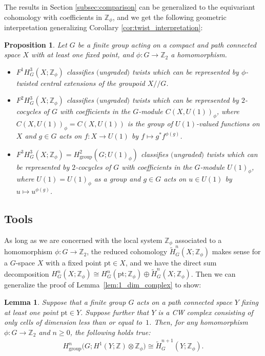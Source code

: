 \documentclass[pdftex]{sigma}
\newtheorem{prop}[thm]{Proposition}
\newtheorem{lem}[thm]{Lemma}
\theoremstyle{definition}
\newcommand{\Z}{\mathbb{Z}}
\newcommand{\pt}{\mathrm{pt}}
\begin{document}
The results in Section \ref{subsec:comparison} can be generalized to the equivariant cohomology with coef\/f\/icients in $\Z_\phi$, and we get the following geometric interpretation generalizing Corollary \ref{cor:twist_interpretation}:

\begin{prop} \label{prop:phi_twist_interpretation}
Let $G$ be a finite group acting on a compact and path connected space $X$ with at least one fixed point, and $\phi \colon G \to \Z_2$ a homomorphism.
\begin{itemize}\itemsep=0pt
\item[$(i)$]
$F^1H^3_G(X; \Z_\phi)$ classifies $($ungraded$)$ twists which can be represented by $\phi$-twisted central extensions of the groupoid $X/\!/G$.

\item[$(ii)$]
$F^2H^3_G(X; \Z_\phi)$ classifies $($ungraded$)$ twists which can be represented by $2$-cocycles of $G$ with coefficients in the $G$-module $C(X, U(1))_\phi$, where $C(X, U(1))_\phi = C(X, U(1))$ is the group of $U(1)$-valued functions on $X$ and $g \in G$ acts on $f \colon X \to U(1)$ by $f \mapsto g^*f^{\phi(g)}$.

\item[$(iii)$]
$F^3H^3_G(X; \Z_\phi) = H^2_{\mathrm{group}}(G; U(1)_\phi)$ classifies $($ungraded$)$ twists which can be represented by $2$-cocycles of $G$ with coefficients in the $G$-module $U(1)_\phi$, where $U(1) = U(1)_\phi$ as a group and $g \in G$ acts on $u \in U(1)$ by $u \mapsto u^{\phi(g)}$.
\end{itemize}
\end{prop}

\subsection{Tools}

As long as we are concerned with the local system $\Z_\phi$ associated to a homomorphism $\phi \colon G \to \Z_2$, the reduced cohomology $\tilde{H}^n_G(X; \Z_\phi)$ makes sense for a $G$-space $X$ with a f\/ixed point $\pt \in X$, and we have the direct sum decomposition $H^n_G(X; \Z_\phi) \cong H^n_G(\pt; \Z_\phi) \oplus \tilde{H}^n_G(X; \Z_\phi)$. Then we can generalize the proof of Lemma~\ref{lem:1_dim_complex} to show:

\begin{lem}
Suppose that a finite group $G$ acts on a path connected space $Y$ fixing at least one point $\pt \in Y$. Suppose further that $Y$ is a CW complex consisting of only cells of dimension less than or equal to~$1$. Then, for any homomorphism $\phi \colon G \to \Z_2$ and $n \ge 0$, the following holds true:
\begin{gather*}
H^n_{\mathrm{group}}\big(G; H^1(Y; \Z) \otimes \Z_\phi\big) \cong \tilde{H}_G^{n+1}(Y; \Z_\phi).
\end{gather*}
\end{lem}
\end{document}
